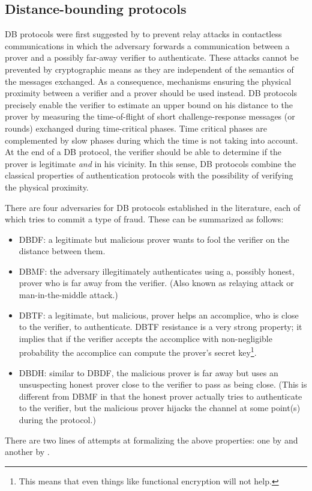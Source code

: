 \subsection{Distance-bounding protocols}%
\label{distance-bounding}

\Ac{DB} protocols were first suggested by \citet{DistanceBounding} to prevent relay attacks in contactless communications in which the adversary forwards a communication between a prover and a possibly far-away verifier to authenticate. 
These attacks cannot be prevented by cryptographic means as they are independent of the semantics of the messages exchanged.
As a consequence, mechanisms ensuring the physical proximity between a verifier and a prover should be used instead.
\Ac{DB} protocols precisely enable the verifier to estimate an upper bound on his distance to the prover by measuring the time-of-flight of short challenge-response messages (or rounds) exchanged during time-critical phases. 
Time critical phases are complemented by slow phases during which the time is not taking into account. 
At the end of a \Ac{DB} protocol, the verifier should be able to determine if the prover is legitimate \emph{and} in his vicinity.
In this sense, \Ac{DB} protocols combine the classical properties of authentication protocols with the possibility of verifying the physical proximity.

There are four adversaries for \ac{DB} protocols established in the literature, 
each of which tries to commit a type of fraud.
These can be summarized as follows:
\begin{itemize}
  \item \Acf{DBDF}: a legitimate but malicious prover wants to fool the verifier on the distance between them.
  \item \Acf{DBMF}: the adversary illegitimately authenticates using a, 
    possibly honest, prover who is far away from the verifier.
    (Also known as relaying attack or man-in-the-middle attack.)
  \item \Acf{DBTF}: a legitimate, but malicious, prover helps an accomplice, 
    who is close to the verifier, to authenticate.
    \Ac{DBTF} resistance is a very strong property; it implies that if the 
    verifier accepts the accomplice with non-negligible probability the 
    accomplice can compute the prover's secret key\footnote{%
      This means that even things like functional encryption will not help.
    }.
  \item \Acf{DBDH}: similar to \ac{DBDF}, the malicious prover is far away but 
    uses an unsuspecting honest prover close to the verifier to pass as being 
    close.
    (This is different from \ac{DBMF} in that the honest prover actually tries 
    to authenticate to the verifier, but the malicious prover hijacks the 
    channel at some point(s) during the protocol.)
\end{itemize}
There are two lines of attempts at formalizing the above properties: one by \citet{DB-BMV} and another by \citet{DB-DFKO}.

